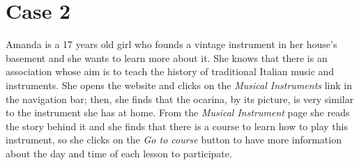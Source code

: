 \documentclass[../../DD.tex]{subfiles}
\begin{document}
\section{Case 2 \label{sect:4.2}}

	Amanda is a 17 years old girl who founds a vintage instrument in her house's basement and she wants to learn more about it. She knows that there is an association whose aim is to teach the history of traditional Italian music and instruments.
	\newline She opens the website and clicks on the \textit{Musical Instruments} link in the navigation bar; then, she finds that the ocarina, by its picture, is very similar to the instrument she has at home.
	From the \textit{Musical Instrument} page she reads the story behind it and she finds that there is a course to learn how to play this instrument, so she clicks on the \textit{Go to course} button to have more information about the day and time of each lesson to participate.
	
\end{document}

